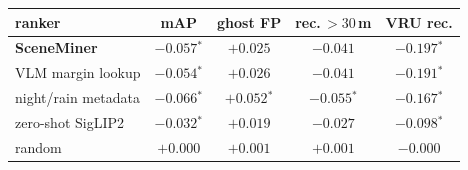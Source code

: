 \setlength{\tabcolsep}{4pt}
\begin{tabular}{lcccc}
\toprule
ranker & mAP & ghost FP & rec.\,$>30$\,m & VRU rec.\\
\midrule
\textbf{SceneMiner} & $-0.057$$^{*}$ & $+0.025$ & $-0.041$ & $-0.197$$^{*}$\\
VLM margin lookup & $-0.054$$^{*}$ & $+0.026$ & $-0.041$ & $-0.191$$^{*}$\\
night/rain metadata & $-0.066$$^{*}$ & $+0.052$$^{*}$ & $-0.055$$^{*}$ & $-0.167$$^{*}$\\
zero-shot SigLIP2 & $-0.032$$^{*}$ & $+0.019$ & $-0.027$ & $-0.098$$^{*}$\\
random & $+0.000$ & $+0.001$ & $+0.001$ & $-0.000$\\
\bottomrule
\end{tabular}
